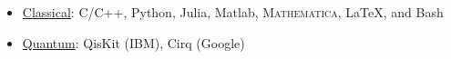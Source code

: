 \renewcommand{\arraystretch}{1.1}

		
	
	\begin{itemize}
	\item \underline{Classical}: C/C++, Python, Julia, Matlab, \textsc{Mathematica}, \LaTeX, and Bash
	\item \underline{Quantum}: QisKit (IBM), Cirq (Google)
	\end{itemize}
	
